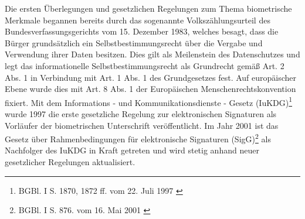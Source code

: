 Die ersten Überlegungen und gesetzlichen Regelungen zum Thema biometrische Merkmale begannen bereits durch
das sogenannte Volkszählungsurteil des Bundesverfassungsgerichts vom 15. Dezember 1983, welches besagt, dass
die Bürger grundsätzlich ein Selbstbestimmungsrecht über die Vergabe und Verwendung ihrer Daten besitzen.
Dies gilt als Meilenstein des Datenschutzes und legt das informationelle Selbstbestimmungsrecht als
Grundrecht gemäß Art. 2 Abs. 1 in Verbindung mit Art. 1 Abs. 1 des Grundgesetzes fest. Auf europäischer Ebene wurde dies mit Art. 8 Abs. 1 der Europäischen Menschenrechtskonvention fixiert. \cite{grundlagen1}\cite{grundlagen2}\cite{grundlagen3} Mit dem Informations - und Kommunikationsdienste - Gesetz (IuKDG)\footnote{\label{foot:2} BGBl. I S. 1870,
1872 ff. vom 22. Juli 1997 \cite{grundlagenFN1}} wurde 1997 die erste gesetzliche Regelung zur elektronischen
Signaturen als Vorläufer der biometrischen Unterschrift veröffentlicht. Im Jahr 2001 ist das Gesetz über Rahmenbedingungen für elektronische Signaturen (SigG)\footnote{\label{foot:3} BGBl. I S. 876. vom 16. Mai 2001 \cite{grundlagenFN2}} als Nachfolger des IuKDG in Kraft getreten und wird stetig anhand neuer gesetzlicher Regelungen aktualisiert. \cite{grundlagen4}
